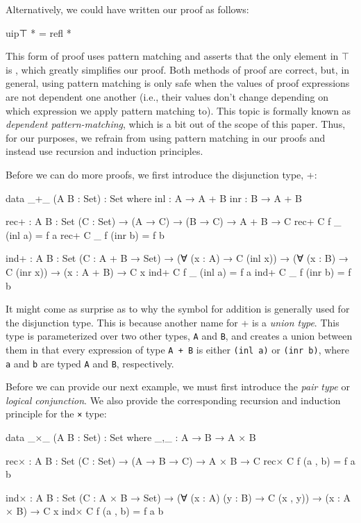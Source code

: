 \documentclass[12pt]{article}
\begin{document}
Alternatively, we could have written our proof as follows:
\begin{center}
\begin{minipage}{0.9\textwidth}
\begin{code}
uip⊤ * = refl *
\end{code}
\end{minipage}
\end{center}
This form of proof uses pattern matching and asserts that the only element in
\(\top\) is {\tt *}, which greatly simplifies our proof. Both methods of proof
are correct, but, in general, using pattern matching is only safe when the
values of proof expressions are not dependent one another (i.e., their values
don't change depending on which expression we apply pattern matching to). This
topic is formally known as {\it dependent pattern-matching}, which is a bit
out of the scope of this paper. Thus, for our purposes, we refrain from using
pattern matching in our proofs and instead use recursion and induction
principles.

Before we can do more proofs, we first introduce the disjunction type, +: 
\begin{center}
\begin{minipage}{0.9\textwidth}
\begin{code}
data _+_ (A B : Set) : Set where
  inl : A → A + B
  inr : B → A + B

rec+ : {A B : Set} (C : Set) → (A → C) → (B → C) →
       A + B → C
rec+ C f _ (inl a) = f a
rec+ C _ f (inr b) = f b

ind+ : {A B : Set} (C : A + B → Set) →
       (∀ (x : A) → C (inl x)) →
       (∀ (x : B) → C (inr x)) →
       (x : A + B) → C x
ind+ C f _ (inl a) = f a
ind+ C _ f (inr b) = f b
\end{code}
\end{minipage}
\end{center}
It might come as surprise as to why the symbol for addition is generally used
for the disjunction type. This is because another name for + is a {\it union type}.
This type is parameterized over two other types, {\tt A} and {\tt B}, and
creates a union between them in that every expression of type {\tt A + B} is
either {\tt (inl a)} or {\tt (inr b)}, where {\tt a} and {\tt b} are typed
{\tt A} and {\tt B}, respectively.

Before we can provide our next example, we must first introduce the
{\em pair type} or {\em logical conjunction}. We also provide the corresponding
recursion and induction principle for the {\tt ×} type:
\begin{center}
\begin{minipage}{0.9\textwidth}
\begin{code}
data _×_ (A B : Set) : Set where
  _,_ : A → B → A × B

rec× : {A B : Set} (C : Set) → (A → B → C) → A × B → C
rec× C f (a , b) = f a b

ind× : {A B : Set} (C : A × B → Set) →
       (∀ (x : A) (y : B) → C (x , y)) →
       (x : A × B) → C x
ind× C f (a , b) = f a b
\end{code}
\end{minipage}
\end{center}
\end{document}
